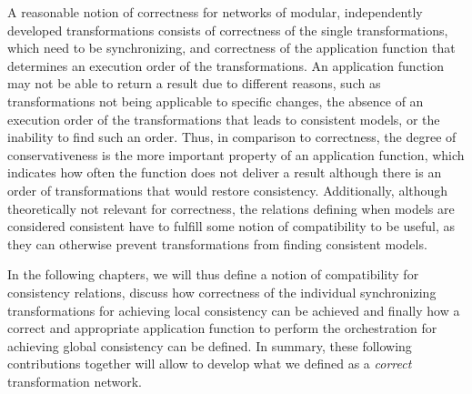 \begin{insight}
    A reasonable notion of correctness for networks of modular, independently developed transformations consists of correctness of the single transformations, which need to be synchronizing, and correctness of the application function that determines an execution order of the transformations.
    An application function may not be able to return a result due to different reasons, such as transformations not being applicable to specific changes, the absence of an execution order of the transformations that leads to consistent models, or the inability to find such an order.
    Thus, in comparison to correctness, the degree of conservativeness is the more important property of an application function, which indicates how often the function does not deliver a result although there is an order of transformations that would restore consistency.
    Additionally, although theoretically not relevant for correctness, the relations defining when models are considered consistent have to fulfill some notion of compatibility to be useful, as they can otherwise prevent transformations from finding consistent models.
\end{insight}

In the following chapters, we will thus define a notion of compatibility for consistency relations, discuss how correctness of the individual synchronizing transformations for achieving local consistency can be achieved and finally how a correct and appropriate application function to perform the orchestration for achieving global consistency can be defined.
In summary, these following contributions together will allow to develop what we defined as a \emph{correct} transformation network.




